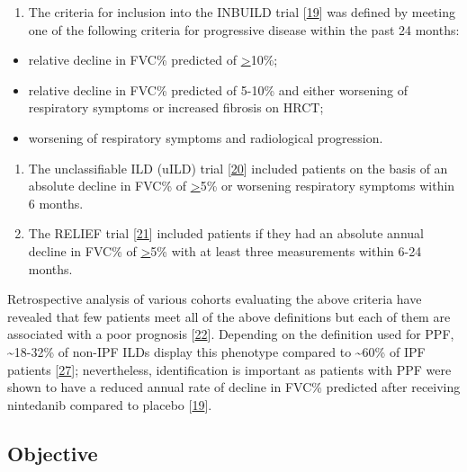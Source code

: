 \documentclass[
]{article}
\providecommand{\tightlist}{%
  \setlength{\itemsep}{0pt}\setlength{\parskip}{0pt}}
\begin{document}
\begin{enumerate}
\def\labelenumi{\arabic{enumi}.}
\setcounter{enumi}{1}
\tightlist
\item
  The criteria for inclusion into the INBUILD trial {[}\protect\hyperlink{ref-flaherty_nintedanib_2019}{19}{]} was defined by meeting one of the following criteria for progressive disease within the past 24 months:
\end{enumerate}

\begin{itemize}
\tightlist
\item
  relative decline in FVC\% predicted of \underline{>}10\%;
\item
  relative decline in FVC\% predicted of 5-10\% and either worsening of respiratory symptoms or increased fibrosis on HRCT;
\item
  worsening of respiratory symptoms and radiological progression.
\end{itemize}

\begin{enumerate}
\def\labelenumi{\arabic{enumi}.}
\setcounter{enumi}{2}
\item
  The unclassifiable ILD (uILD) trial {[}\protect\hyperlink{ref-maher_pirfenidone_2020}{20}{]} included patients on the basis of an absolute decline in FVC\% of \underline{>}5\% or worsening respiratory symptoms within 6 months.
\item
  The RELIEF trial {[}\protect\hyperlink{ref-behr_pirfenidone_2021}{21}{]} included patients if they had an absolute annual decline in FVC\% of \underline{>}5\% with at least three measurements within 6-24 months.
\end{enumerate}

Retrospective analysis of various cohorts evaluating the above criteria have revealed that few patients meet all of the above definitions but each of them are associated with a poor prognosis {[}\protect\hyperlink{ref-khor_patient_2023}{22}{]}. Depending on the definition used for PPF, \textasciitilde18-32\% of non-IPF ILDs display this phenotype compared to \textasciitilde60\% of IPF patients {[}\protect\hyperlink{ref-rajan_progressive_2023}{27}{]}; nevertheless, identification is important as patients with PPF were shown to have a reduced annual rate of decline in FVC\% predicted after receiving nintedanib compared to placebo {[}\protect\hyperlink{ref-flaherty_nintedanib_2019}{19}{]}.

\hypertarget{objective}{%
\subsection{Objective}\label{objective}}
\end{document}

